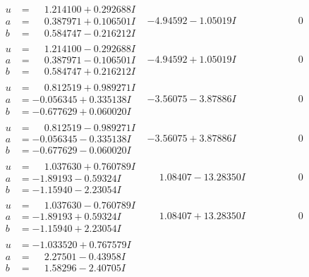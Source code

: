 \documentclass[1p]{elsarticle_modified}
\theoremstyle{definition}
\begin{document}
$$\begin{array}{c|c|c}
\begin{aligned}
u &= \phantom{-}1.214100 + 0.292688 I \\
a &= \phantom{-}0.387971 + 0.106501 I \\
b &= \phantom{-}0.584747 - 0.216212 I\end{aligned}
 & -4.94592 - 1.05019 I & \phantom{-0.000000 } 0 \\ \hline\begin{aligned}
u &= \phantom{-}1.214100 - 0.292688 I \\
a &= \phantom{-}0.387971 - 0.106501 I \\
b &= \phantom{-}0.584747 + 0.216212 I\end{aligned}
 & -4.94592 + 1.05019 I & \phantom{-0.000000 } 0 \\ \hline\begin{aligned}
u &= \phantom{-}0.812519 + 0.989271 I \\
a &= -0.056345 + 0.335138 I \\
b &= -0.677629 + 0.060020 I\end{aligned}
 & -3.56075 - 3.87886 I & \phantom{-0.000000 } 0 \\ \hline\begin{aligned}
u &= \phantom{-}0.812519 - 0.989271 I \\
a &= -0.056345 - 0.335138 I \\
b &= -0.677629 - 0.060020 I\end{aligned}
 & -3.56075 + 3.87886 I & \phantom{-0.000000 } 0 \\ \hline\begin{aligned}
u &= \phantom{-}1.037630 + 0.760789 I \\
a &= -1.89193 - 0.59324 I \\
b &= -1.15940 - 2.23054 I\end{aligned}
 & \phantom{-}1.08407 - 13.28350 I & \phantom{-0.000000 } 0 \\ \hline\begin{aligned}
u &= \phantom{-}1.037630 - 0.760789 I \\
a &= -1.89193 + 0.59324 I \\
b &= -1.15940 + 2.23054 I\end{aligned}
 & \phantom{-}1.08407 + 13.28350 I & \phantom{-0.000000 } 0 \\ \hline\begin{aligned}
u &= -1.033520 + 0.767579 I \\
a &= \phantom{-}2.27501 - 0.43958 I \\
b &= \phantom{-}1.58296 - 2.40705 I\end{aligned}

\end{array}$$
\end{document}
